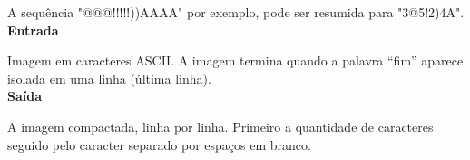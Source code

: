\documentclass[a4paper, 12pt]{article}
\begin{document}
\newline \newline
A sequência "@@@!!!!!))AAAA" por exemplo, pode ser resumida para "3@5!2)4A".
\\

\newline \newline
\textbf{{\large Entrada}} \newline

Imagem em caracteres ASCII. A imagem termina quando a palavra “fim” aparece isolada em uma linha (última linha).
\\

\newline \newline
\textbf{{\large Saída}} \newline

A imagem compactada, linha por linha. Primeiro a quantidade de caracteres seguido pelo caracter separado por espaços em branco.
\newline
\\
\\
\newline \newline
\end{document}
